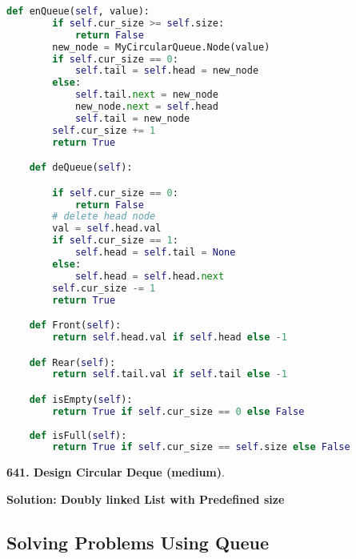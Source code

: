 \documentclass[../main.tex]{subfiles}
\begin{document}
\begin{examples}[resume]
\begin{lstlisting}[language=Python]
    def enQueue(self, value):
        if self.cur_size >= self.size:
            return False
        new_node = MyCircularQueue.Node(value)
        if self.cur_size == 0:
            self.tail = self.head = new_node
        else:
            self.tail.next = new_node
            new_node.next = self.head
            self.tail = new_node
        self.cur_size += 1
        return True        

    def deQueue(self):

        if self.cur_size == 0:
            return False
        # delete head node
        val = self.head.val
        if self.cur_size == 1:
            self.head = self.tail = None
        else:
            self.head = self.head.next
        self.cur_size -= 1
        return True    

    def Front(self):
        return self.head.val if self.head else -1

    def Rear(self):
        return self.tail.val if self.tail else -1

    def isEmpty(self):        
        return True if self.cur_size == 0 else False
    
    def isFull(self):
        return True if self.cur_size == self.size else False
\end{lstlisting}
\item \textbf{641. Design Circular Deque (medium)}. 

\textbf{Solution: Doubly linked List with Predefined size}
\end{examples}
\subsection{Solving Problems Using Queue}
\end{document}
